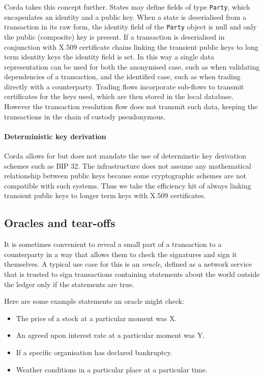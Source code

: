 \documentclass{article}
\begin{document}
Corda takes this concept further. States may define fields of type \texttt{Party}, which encapsulates an identity
and a public key. When a state is deserialised from a transaction in its raw form, the identity field of the
\texttt{Party} object is null and only the public (composite) key is present. If a transaction is deserialised
in conjunction with X.509 certificate chains linking the transient public keys to long term identity keys the
identity field is set. In this way a single data representation can be used for both the anonymised case, such
as when validating dependencies of a transaction, and the identified case, such as when trading directly with
a counterparty. Trading flows incorporate sub-flows to transmit certificates for the keys used, which are then
stored in the local database. However the transaction resolution flow does not transmit such data, keeping the
transactions in the chain of custody pseudonymous.

\paragraph{Deterministic key derivation} Corda allows for but does not mandate the use of determinstic key
derivation schemes such as BIP 32\cite{BIP32}. The infrastructure does not assume any mathematical relationship
between public keys because some cryptographic schemes are not compatible with such systems. Thus we take the
efficiency hit of always linking transient public keys to longer term keys with X.509 certificates.


\subsection{Oracles and tear-offs}\label{sec:tear-offs}

It is sometimes convenient to reveal a small part of a transaction to a counterparty in a way that allows them
to check the signatures and sign it themselves. A typical use case for this is an \emph{oracle}, defined as a
network service that is trusted to sign transactions containing statements about the world outside the ledger
only if the statements are true.

Here are some example statements an oracle might check:

\begin{itemize}
\item The price of a stock at a particular moment was X.
\item An agreed upon interest rate at a particular moment was Y.
\item If a specific organisation has declared bankruptcy.
\item Weather conditions in a particular place at a particular time.
\end{itemize}
\end{document}
